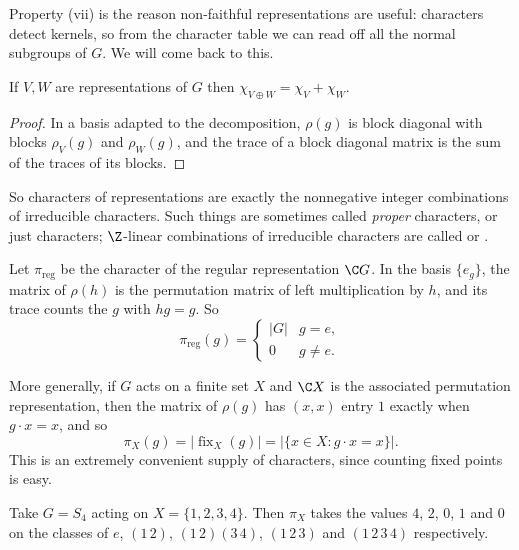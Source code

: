 Property (vii) is the reason non-faithful representations are useful: characters detect kernels, so from the character table we can read off all the normal subgroups of $G$. We will come back to this.

\begin{proposition}
	If $V, W$ are representations of $G$ then $\chi_{V \oplus W} = \chi_V + \chi_W$.
\end{proposition}
\begin{proof}
	In a basis adapted to the decomposition, $\rho(g)$ is block diagonal with blocks $\rho_V(g)$ and $\rho_W(g)$, and the trace of a block diagonal matrix is the sum of the traces of its blocks.
\end{proof}

So characters of representations are exactly the nonnegative integer combinations of irreducible characters. Such things are sometimes called \emph{proper} characters, or just characters; $\Z$-linear combinations of irreducible characters are called  or .

\begin{example}
	Let $\pi_{\text{reg}}$ be the character of the regular representation $\C G$. In the basis $\{e_g\}$, the matrix of $\rho(h)$ is the permutation matrix of left multiplication by $h$, and its trace counts the $g$ with $hg = g$. So
	$$\pi_{\text{reg}}(g) = \begin{cases} |G| & g = e, \\ 0 & g \neq e.\end{cases}$$
\end{example}

\begin{example}
	More generally, if $G$ acts on a finite set $X$ and $\C X$ is the associated permutation representation, then the matrix of $\rho(g)$ has $(x,x)$ entry $1$ exactly when $g\cdot x = x$, and so
	$$\pi_X(g) = |\operatorname{fix}_X(g)| = |\{x \in X: g\cdot x = x\}|.$$
	This is an extremely convenient supply of characters, since counting fixed points is easy.
\end{example}

\begin{example}
	Take $G = S_4$ acting on $X = \{1,2,3,4\}$. Then $\pi_X$ takes the values $4$, $2$, $0$, $1$ and $0$ on the classes of $e$, $(1\,2)$, $(1\,2)(3\,4)$, $(1\,2\,3)$ and $(1\,2\,3\,4)$ respectively.
\end{example}

